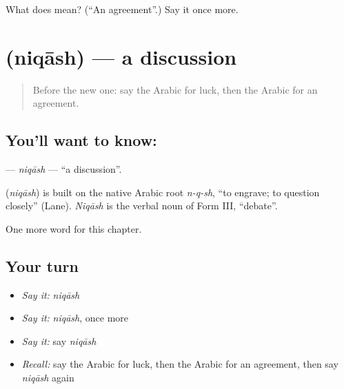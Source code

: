\begin{tcolorbox}[breakable,colback=teal!4,colframe=teal!35!black,title={Before you move on}]
What does  mean? (\textquotedblleft{}An agreement\textquotedblright{}.) Say it once more.
\end{tcolorbox}
\section[\texorpdfstring{\ar{نقاش} (niqāsh)}{نقاش (niqāsh)}]{ (niqāsh) — a discussion}

\label{lesson:AR-C239-niqash}



\begin{quote}
Before the new one: say the Arabic for luck, then the Arabic for an agreement.
\end{quote}

\subsection*{You'll want to know: }
\textbf{} — \emph{niqāsh} — \textquotedblleft{}a discussion\textquotedblright{}.

\begin{cousinweb}
\textbf{} (\emph{niqāsh}) is built on the native Arabic root \emph{n-q-sh}, \textquotedblleft{}to engrave; to question closely\textquotedblright{} (Lane). \emph{Niqāsh} is the verbal noun of Form III, \textquotedblleft{}debate\textquotedblright{}.
\end{cousinweb}

\begin{grammarlens}[title={What you've built}]
One more word for this chapter.
\end{grammarlens}

\subsection*{Your turn}
\begin{itemize}
\raggedright
  \item \emph{Say it:} \emph{niqāsh}
  \item \emph{Say it:} \emph{niqāsh}, once more
  \item \emph{Say it:} say \emph{niqāsh}
  \item \emph{Recall:} say the Arabic for luck, then the Arabic for an agreement, then say \emph{niqāsh} again
\end{itemize}

